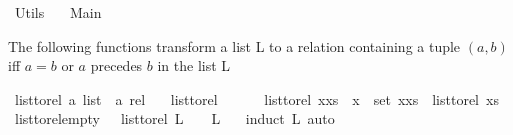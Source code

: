 %
\begin{isabellebody}%
%
%
\isadelimtheory
\isanewline
%
\endisadelimtheory
%
\isatagtheory
{}\isamarkupfalse%
\ Utils\isanewline
\ \ \ Main\isanewline
{}%
\endisatagtheory
{\isafoldtheory}%
%
\isadelimtheory
%
\endisadelimtheory
%
\begin{isamarkuptext}%
The following functions transform a list L to a relation containing a  tuple $(a,b)$
  iff $a = b$ or $a$ precedes $b$ in the list L%
\end{isamarkuptext}\isamarkuptrue%
\isamarkupfalse%
\ list{\isacharunderscore}{\kern0pt}to{\isacharunderscore}{\kern0pt}rel{\isacharcolon}{\kern0pt}{\isacharcolon}{\kern0pt}\ {\isachardoublequoteopen}{\isacharprime}{\kern0pt}a\ list\ {\isasymRightarrow}\ {\isacharprime}{\kern0pt}a\ rel{\isachardoublequoteclose}\isanewline
\ \ \ {\isachardoublequoteopen}list{\isacharunderscore}{\kern0pt}to{\isacharunderscore}{\kern0pt}rel\ {\isacharbrackleft}{\kern0pt}{\isacharbrackright}{\kern0pt}\ {\isacharequal}{\kern0pt}\ {\isacharbraceleft}{\kern0pt}{\isacharbraceright}{\kern0pt}{\isachardoublequoteclose}\isanewline
\ \ {\isacharbar}{\kern0pt}\ {\isachardoublequoteopen}list{\isacharunderscore}{\kern0pt}to{\isacharunderscore}{\kern0pt}rel\ {\isacharparenleft}{\kern0pt}x{\isacharhash}{\kern0pt}xs{\isacharparenright}{\kern0pt}\ {\isacharequal}{\kern0pt}\ {\isacharbraceleft}{\kern0pt}x{\isacharbraceright}{\kern0pt}\ {\isasymtimes}\ {\isacharparenleft}{\kern0pt}set\ {\isacharparenleft}{\kern0pt}x{\isacharhash}{\kern0pt}xs{\isacharparenright}{\kern0pt}{\isacharparenright}{\kern0pt}\ {\isasymunion}\ list{\isacharunderscore}{\kern0pt}to{\isacharunderscore}{\kern0pt}rel\ xs{\isachardoublequoteclose}\isanewline
\isanewline
\isanewline
{}\isamarkupfalse%
\ list{\isacharunderscore}{\kern0pt}to{\isacharunderscore}{\kern0pt}rel{\isacharunderscore}{\kern0pt}empty\ {\isacharcolon}{\kern0pt}\ {\isachardoublequoteopen}\ list{\isacharunderscore}{\kern0pt}to{\isacharunderscore}{\kern0pt}rel\ L\ {\isacharequal}{\kern0pt}\ {\isacharbraceleft}{\kern0pt}{\isacharbraceright}{\kern0pt}\ {\isasymLongrightarrow}\ L\ {\isacharequal}{\kern0pt}\ {\isacharbrackleft}{\kern0pt}{\isacharbrackright}{\kern0pt}{\isachardoublequoteclose}\ \isanewline
%
\isadelimproof
%
\endisadelimproof
%
\isatagproof
{}\isamarkupfalse%
{\isacharparenleft}{\kern0pt}induct\ L{\isacharcomma}{\kern0pt}\ auto{\isacharparenright}{\kern0pt}\ \isamarkupfalse%
%
\endisatagproof

\end{isabellebody}
